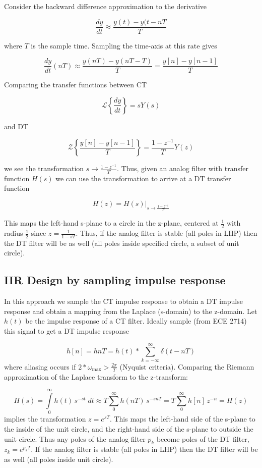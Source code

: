 \documentclass{article}
\begin{document}
Consider the backward difference approximation to the derivative

\[
\frac{dy}{dt} \approx \frac{y(t) - y(t -nT}{T}
\]

where $T$ is the sample time. Sampling the time-axis at this rate gives

\[
\frac{dy}{dt}(nT) \approx \frac{y(nT) - y(nT-T)}{T} = \frac{y[n]-y[n-1]}{T}
\]

Comparing the transfer functions between CT

\[
\mathcal{L}\left\{ \frac{dy}{dt}\right\} = s Y(s)
\]

and DT

\[
\mathcal{Z}\left\{ \frac{y[n]-y[n-1]}{T} \right\} = \frac{1-z^{-1}}{T} Y(z)
\]

we see the transformation $s \longrightarrow \frac{1-z^{-1}}{T}$. Thus, given an analog filter with transfer function $H(s)$ we can use the transformation to arrive at a DT transfer function

\[
H(z) = \left. H(s) \right|_{s \longrightarrow \frac{1-z^{-1}}{T}}
\]

This maps the left-hand s-plane to a circle in the z-plane, centered at $\frac{1}{2}$ with radius $\frac{1}{2}$ since $z = \frac{1}{1-sT}$. Thus, if the analog filter is stable (all poles in LHP) then the DT filter will be as well (all poles inside specified circle, a subset of unit circle).

\subsection{IIR Design by sampling impulse response}

In this approach we sample the CT impulse response to obtain a DT impulse response and obtain a mapping from the Laplace (s-domain) to the z-domain. Let $h(t)$ be the impulse response of a CT filter. Ideally sample (from ECE 2714) this signal to get a DT impulse response

\[
h[n] = h{nT} = h(t) * \sum\limits_{k = -\infty}^{\infty} \delta(t-nT) 
\]
where aliasing occurs if $2*\omega_{\mbox{max}} > \frac{2\pi}{T}$ (Nyquist criteria). Comparing the Riemann approximation of the Laplace transform to the z-transform:

\[
H(s) = \int\limits_{0}^{\infty} h(t)\, s^{-st}\; dt \approx T \sum\limits_{0}^{\infty} h(nT)\, s^{-snT} = T \sum\limits_{0}^{\infty} h[n]\, z^{-n} = H(z) 
\]
implies the transformation $z = e^{sT}$. This maps the left-hand side of the s-plane to the inside of the unit circle, and the right-hand side of the s-plane to outside the unit circle. Thus any poles of the analog filter $p_k$ become poles of the DT filter, $z_k = e^{p_k T}$. If the analog filter is stable (all poles in LHP) then the DT filter will be as well (all poles inside unit circle).
\end{document}
